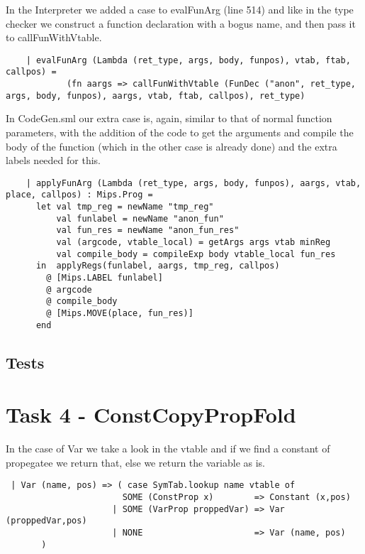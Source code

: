 \documentclass{article}
\begin{document}
\noindent In the Interpreter we added a case to evalFunArg (line 514) and like in the type checker we construct a function declaration with a bogus name, and then pass it to callFunWithVtable.

\begin{verbatim}
    | evalFunArg (Lambda (ret_type, args, body, funpos), vtab, ftab, callpos) =
            (fn aargs => callFunWithVtable (FunDec ("anon", ret_type, args, body, funpos), aargs, vtab, ftab, callpos), ret_type)
\end{verbatim}

\noindent In CodeGen.sml our extra case is, again, similar to that of normal function parameters, with the addition of the code to get the arguments and compile the body of the function (which in the other case is already done) and the extra labels needed for this.

\begin{verbatim}
    | applyFunArg (Lambda (ret_type, args, body, funpos), aargs, vtab, place, callpos) : Mips.Prog =
      let val tmp_reg = newName "tmp_reg"
          val funlabel = newName "anon_fun"
          val fun_res = newName "anon_fun_res"
          val (argcode, vtable_local) = getArgs args vtab minReg
          val compile_body = compileExp body vtable_local fun_res
      in  applyRegs(funlabel, aargs, tmp_reg, callpos)
        @ [Mips.LABEL funlabel]
        @ argcode
        @ compile_body
        @ [Mips.MOVE(place, fun_res)]
      end
\end{verbatim}

\subsection{Tests}

\newpage

\section{Task 4 - ConstCopyPropFold}
In the case of Var we take a look in the vtable and if we find a constant of propegatee we return that, else we return the variable as is.

\begin{verbatim}
 | Var (name, pos) => ( case SymTab.lookup name vtable of
                       SOME (ConstProp x)        => Constant (x,pos) 
                     | SOME (VarProp proppedVar) => Var (proppedVar,pos)
                     | NONE                      => Var (name, pos)
       )
\end{verbatim}
\end{document}
